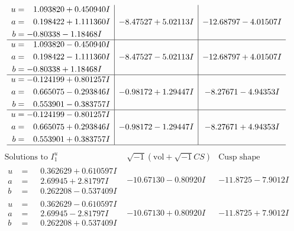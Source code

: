 \documentclass[1p]{elsarticle_modified}
\theoremstyle{definition}
\newcommand{\I}{\sqrt{-1}}
\begin{document}
$$\begin{array}{c|c|c}
\begin{aligned}
u &= \phantom{-}1.093820 + 0.450940 I \\
a &= \phantom{-}0.198422 + 1.111360 I \\
b &= -0.80338 - 1.18468 I\end{aligned}
 & -8.47527 + 5.02113 I & -12.68797 - 4.01507 I \\ \hline\begin{aligned}
u &= \phantom{-}1.093820 - 0.450940 I \\
a &= \phantom{-}0.198422 - 1.111360 I \\
b &= -0.80338 + 1.18468 I\end{aligned}
 & -8.47527 - 5.02113 I & -12.68797 + 4.01507 I \\ \hline\begin{aligned}
u &= -0.124199 + 0.801257 I \\
a &= \phantom{-}0.665075 - 0.293846 I \\
b &= \phantom{-}0.553901 - 0.383757 I\end{aligned}
 & -0.98172 + 1.29447 I & -8.27671 - 4.94353 I \\ \hline\begin{aligned}
u &= -0.124199 - 0.801257 I \\
a &= \phantom{-}0.665075 + 0.293846 I \\
b &= \phantom{-}0.553901 + 0.383757 I\end{aligned}
 & -0.98172 - 1.29447 I & -8.27671 + 4.94353 I\\
 \hline 
 \end{array}$$\newpage$$\begin{array}{c|c|c}  
\text{Solutions to }I^u_{1}& \I (\text{vol} + \sqrt{-1}CS) & \text{Cusp shape}\\
 \hline 
\begin{aligned}
u &= \phantom{-}0.362629 + 0.610597 I \\
a &= \phantom{-}2.69945 + 2.81797 I \\
b &= \phantom{-}0.262208 - 0.537409 I\end{aligned}
 & -10.67130 - 0.80920 I & -11.8725 - 7.9012 I \\ \hline\begin{aligned}
u &= \phantom{-}0.362629 - 0.610597 I \\
a &= \phantom{-}2.69945 - 2.81797 I \\
b &= \phantom{-}0.262208 + 0.537409 I\end{aligned}
 & -10.67130 + 0.80920 I & -11.8725 + 7.9012 I \\ \hline\begin{aligned}

\end{aligned}
\end{array}$$
\end{document}
